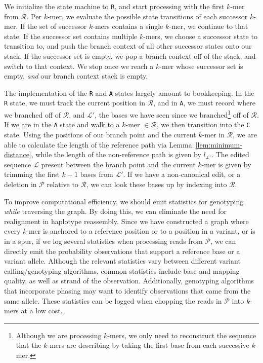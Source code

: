 \documentclass[11pt]{article}
\begin{document}
We initialize the state machine to \texttt{R}, and start processing with the first $k$-mer from $\mathcal{R}$.
Per $k$-mer, we evaluate the possible state transitions of each successor $k$-mer. If the set of successor
$k$-mers contains a single $k$-mer, we continue to that state. If the successor set contains multiple
$k$-mers, we choose a successor state to transition to, and push the branch context of all other
successor states onto our stack. If the successor set is empty, we pop a branch context off of the stack,
and switch to that context. We stop once we reach a $k$-mer whose successor set is empty, \emph{and}
our branch context stack is empty.

The implementation of the \texttt{R} and \texttt{A} states largely amount to bookkeeping. In the \texttt{R}
state, we must track the current position in $\mathcal{R}$, and in \texttt{A}, we must record where we
branched off of $\mathcal{R}$, and $\mathcal{L}'$, the bases we have seen since we
branched\footnote{Although we are processing $k$-mers, we only need to reconstruct the sequence that
the $k$-mers are describing by taking the first base from each successive $k$-mer.} off of $\mathcal{R}$.
If we are in the \texttt{A} state and walk to a $k$-mer $\in \mathcal{R}$, we then transition into the
\texttt{C} state. Using the positions of our branch point and the current $k$-mer in $\mathcal{R}$, we are
able to calculate the length of the reference path via Lemma~\ref{lem:minimum-distance}, while the length
of the non-reference path is given by $l_{\mathcal{L}'}$. The edited sequence $\mathcal{L}$ present
between the branch point and the current $k$-mer is given by trimming the first $k - 1$ bases from
$\mathcal{L}'$. If we have a non-canonical edit, or a deletion in $\mathcal{P}$ relative to $\mathcal{R}$,
we can look these bases up by indexing into $\mathcal{R}$.

To improve computational efficiency, we should emit statistics for genotyping \emph{while} traversing the graph. By doing
this, we can eliminate the need for realignment in haplotype reassembly. Since we have constructed a
graph where every $k$-mer is anchored to a reference position or to a position in a variant, or is in a spur,
if we log several statistics when processing reads from $\mathcal{P}$, we can directly emit the probability
observations that support a reference base or a variant allele. Although the relevant statistics vary
between different variant calling/genotyping algorithms, common statistics include base and mapping
quality, as well as strand of the observation. Additionally, genotyping algorithms that incorporate phasing
may want to identify observations that came from the same allele. These statistics can be logged when
chopping the reads in $\mathcal{P}$ into $k$-mers at a low cost.
\end{document}
